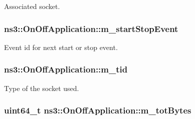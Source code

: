 Associated socket. 

\subsubsection[{\texorpdfstring{m\+\_\+start\+Stop\+Event}{m_startStopEvent}}]{ ns3\+::\+On\+Off\+Application\+::m\+\_\+start\+Stop\+Event\hspace{0.3cm}{\ttfamily [private]}}\hypertarget{classns3_1_1OnOffApplication_a5edd515322823a3813fff952bb32f8d0}{}\label{classns3_1_1OnOffApplication_a5edd515322823a3813fff952bb32f8d0}


Event id for next start or stop event. 

\subsubsection[{\texorpdfstring{m\+\_\+tid}{m_tid}}]{ ns3\+::\+On\+Off\+Application\+::m\+\_\+tid\hspace{0.3cm}{\ttfamily [private]}}\hypertarget{classns3_1_1OnOffApplication_ad57d7f1a8a5e0e9358b41bab3c49c757}{}\label{classns3_1_1OnOffApplication_ad57d7f1a8a5e0e9358b41bab3c49c757}


Type of the socket used. 

\subsubsection[{\texorpdfstring{m\+\_\+tot\+Bytes}{m_totBytes}}]{\setlength{\rightskip}{0pt plus 5cm}uint64\+\_\+t ns3\+::\+On\+Off\+Application\+::m\+\_\+tot\+Bytes\hspace{0.3cm}{\ttfamily [private]}}\hypertarget{classns3_1_1OnOffApplication_ab43f8091f6fac16d5aed373e7e35c739}{}\label{classns3_1_1OnOffApplication_ab43f8091f6fac16d5aed373e7e35c739}


